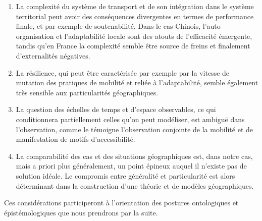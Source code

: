 \begin{enumerate}
	\item La complexité du système de transport et de son intégration dans le système territorial peut avoir des conséquences divergentes en termes de performance finale, et par exemple de soutenabilité. Dans le cas Chinois, l'auto-organisation et l'adaptabilité locale sont des atouts de l'efficacité émergente, tandis qu'en France la complexité semble être source de freins et finalement d'externalités négatives. 
	\item La résilience, qui peut être caractérisée par exemple  par la vitesse de mutation des pratiques de mobilité et reliée à l'adaptabilité, semble également très sensible aux particularités géographiques.
	\item La question des échelles de temps et d'espace observables, ce qui conditionnera partiellement celles qu'on peut modéliser, est ambiguë dans l'observation, comme le témoigne l'observation conjointe de la mobilité et de manifestation de motifs d'accessibilité.
	\item La comparabilité des cas et des situations géographiques est, dans notre cas, mais a priori plus généralement, un point épineux auquel il n'existe pas de solution idéale. Le compromis entre généralité et particularité est alors déterminant dans la construction d'une théorie et de modèles géographiques. 
\end{enumerate}


Ces considérations participeront à l'orientation des postures ontologiques et épistémologiques que nous prendrons par la suite.




\stars




